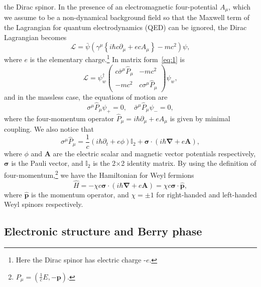 \documentclass[11pt, a4paper]{article}
\begin{document}
the Dirac spinor.
In the presence of an electromagnetic four-potential $A_\mu$, which we
assume to be a non-dynamical background field so that the Maxwell term of the Lagrangian
for quantum electrodynamics (QED) can be ignored,
the Dirac Lagrangian becomes
\begin{equation}\label{eq:1}
  \mathcal{L} = \bar{\psi}\left( \gamma^\mu \left\{
  i\hbar c \partial_\mu +  e c A_\mu \right\} - mc^2 \right)\psi,
\end{equation}
where $e$ is the elementary charge.\footnote{Here the Dirac spinor has electric charge -$e$.}
In matrix form~\eqref{eq:1} is
\begin{equation}\label{eq:5}
  \mathcal{L} = \psi_w^\dagger
  \begin{pmatrix} c \bar{\sigma}^\mu \widehat{P}_\mu & -mc^2 \\
  -mc^2 & c \sigma^\mu\widehat{P}_\mu  \end{pmatrix}
  \psi_w,
\end{equation}
and in the massless case, the equations of motion are
\begin{equation}
  \sigma^\mu \widehat{P}_\mu \psi_+ = 0, \quad
  \bar{\sigma}^\mu \widehat{P}_\mu \psi_- =0,
\end{equation}
where the four-momentum operator $\widehat{P}_\mu = i\hbar \partial_\mu + e A_\mu$
is given by minimal coupling.
We also notice that
\begin{equation}
  \sigma^\mu \widehat{P}_\mu  = \frac{1}{c}  \left(i \hbar \partial_t + e \phi \right)\mathbb{I}_2
  + \bm{\sigma \cdot} \left( i\hbar \bm{\nabla} + e \bm{A} \right),
\end{equation}
where $\phi$ and $\bm{A}$ are the electric scalar and magnetic vector potentials
respectively, $\bm{\sigma}$ is the Pauli vector, and $\mathbb{I}_2$
is the 2$\times$2 identity matrix. By 
using the definition of four-momentum,\footnote{$P_{\mu} = (\frac{1}{c}E, -\bm{p})$.} we have
the Hamiltonian for Weyl fermions
\begin{equation}\label{eq:2}
  \widehat{H} = - \chi c \bm{\sigma \cdot} (i\hbar \bm{\nabla} + e\bm{A} ) = \chi c
  \bm{\sigma \cdot \hat{p}},
\end{equation}
where $\bm{\hat{p}}$ is the momentum operator, and $\chi =\pm 1$ for right-handed and left-handed
Weyl spinors respectively.

\subsection{Electronic structure and Berry phase}
\end{document}
